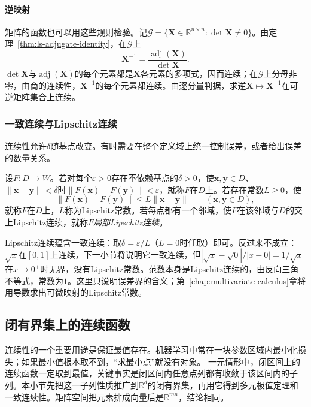 \paragraph{逆映射}
矩阵的函数也可以用这些规则检验。记$\mathcal G=\{\bm X\in\mathbb R^{n\times n}:\det\bm X\neq0\}$。由定理~\ref{thm:ls-adjugate-identity}，在$\mathcal G$上
\[
 \bm X^{-1}=\frac{\operatorname{adj}(\bm X)}{\det\bm X}.
\]
$\det\bm X$与$\operatorname{adj}(\bm X)$的每个元素都是$\bm X$各元素的多项式，因而连续；在$\mathcal G$上分母非零，由商的连续性，$\bm X^{-1}$的每个元素都连续。由逐分量判据，求逆$\bm X\mapsto\bm X^{-1}$在可逆矩阵集合上连续。

\subsubsection{一致连续与Lipschitz连续}
\label{sec:multivariable-uniform-lipschitz}

连续性允许$\delta$随基点改变。有时需要在整个定义域上统一控制误差，或者给出误差的数量关系。
\begin{definition}[一致连续与Lipschitz连续]
\label{def:ls-lipschitz}
设$F:D\to W$。若对每个$\varepsilon>0$存在不依赖基点的$\delta>0$，使$\bm x,\bm y\in D$、$\lVert\bm x-\bm y\rVert<\delta$时$\lVert F(\bm x)-F(\bm y)\rVert<\varepsilon$，就称$F$在$D$上。若存在常数$L\geq0$，使
\[
 \lVert F(\bm x)-F(\bm y)\rVert\leq L\lVert\bm x-\bm y\rVert\qquad(\bm x,\bm y\in D),
\]
就称$F$在$D$上，$L$称为Lipschitz常数。若每点都有一个邻域，使$F$在该邻域与$D$的交上Lipschitz连续，就称$F$\emph{局部Lipschitz连续}。
\end{definition}
Lipschitz连续蕴含一致连续：取$\delta=\varepsilon/L$（$L=0$时任取）即可。反过来不成立：$\sqrt x$在$[0,1]$上连续，下一小节将说明它一致连续，但$|\sqrt x-\sqrt0|/|x-0|=1/\sqrt x$在$x\to0^+$时无界，没有Lipschitz常数。范数本身是Lipschitz连续的，由反向三角不等式，常数为$1$。这里只说明误差界的含义；第~\ref{chap:multivariate-calculus}章将用导数求出可微映射的Lipschitz常数。

\subsection{闭有界集上的连续函数}

连续性的一个重要用途是保证最值存在。机器学习中常在一块参数区域内最小化损失；如果最小值根本取不到，“求最小点”就没有对象。
一元情形中，闭区间上的连续函数一定取到最值，关键事实是闭区间内任意点列都有收敛于该区间内的子列。本小节先把这一子列性质推广到$\mathbb R^d$的闭有界集，再用它得到多元极值定理和一致连续性。矩阵空间把元素排成向量后是$\mathbb R^{mn}$，结论相同。

